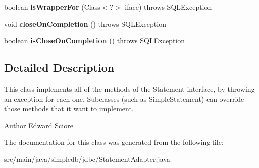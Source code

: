 \begin{DoxyCompactItemize}
boolean {\bfseries is\+Wrapper\+For} (Class$<$?$>$ iface)  throws S\+Q\+L\+Exception 
\item 
\mbox{\label{classsimpledb_1_1jdbc_1_1StatementAdapter_af037cb3940b2165c40be14e1fd7eeef2}} 
void {\bfseries close\+On\+Completion} ()  throws S\+Q\+L\+Exception 
\item 
\mbox{\label{classsimpledb_1_1jdbc_1_1StatementAdapter_a26ac53c34192a856d1d32511215aeddd}} 
boolean {\bfseries is\+Close\+On\+Completion} ()  throws S\+Q\+L\+Exception 
\end{DoxyCompactItemize}


\subsection{Detailed Description}
This class implements all of the methods of the Statement interface, by throwing an exception for each one. Subclasses (such as Simple\+Statement) can override those methods that it want to implement. \begin{DoxyAuthor}{Author}
Edward Sciore 
\end{DoxyAuthor}


The documentation for this class was generated from the following file\+:\begin{DoxyCompactItemize}
\item 
src/main/java/simpledb/jdbc/Statement\+Adapter.\+java\end{DoxyCompactItemize}

